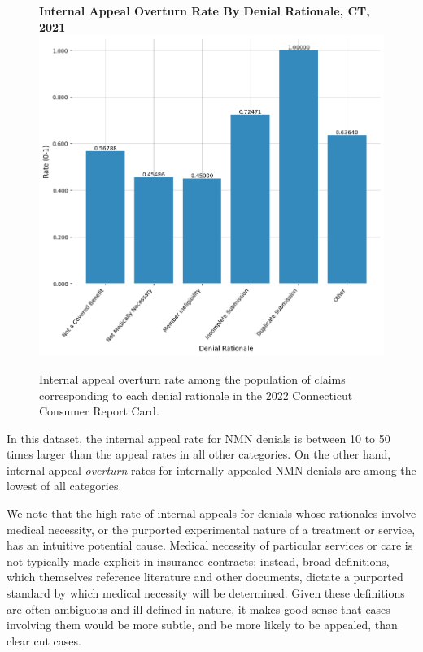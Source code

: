 \documentclass[12pt, a4paper,twoside]{report}
\theoremstyle{plain} %
\theoremstyle{definition} %
\theoremstyle{remark} %
\numberwithin{equation}{chapter}
\begin{document}
			\begin{figure}[h!]
				\centering
				\textbf{Internal Appeal Overturn Rate By Denial Rationale, CT, 2021}
				\includegraphics[width=\columnwidth]{images/ct_claims/internal_appeal_overturns_by_rationale.png}
				\caption{Internal appeal overturn rate among the population of claims corresponding to each denial rationale in the 2022 Connecticut Consumer Report Card.}
				\label{ctinternalappealoverturnratebydenialrationale}
			\end{figure}
		
		In this dataset, the internal appeal rate for NMN denials is between 10 to 50 times larger than the appeal rates in all other categories. On the other hand, internal appeal \emph{overturn} rates for internally appealed NMN denials are among the lowest of all categories.
		
		
		We note that the high rate of internal appeals for denials whose rationales involve medical necessity, or the purported experimental nature of a treatment or service, has an intuitive potential cause. Medical necessity of particular services or care is not typically made explicit in insurance contracts; instead, broad definitions, which themselves reference literature and other documents, dictate a purported standard by which medical necessity will be determined. Given these definitions are often ambiguous and ill-defined in nature, it makes good sense that cases involving them would be more subtle, and be more likely to be appealed, than clear cut cases.
		
\end{document}
